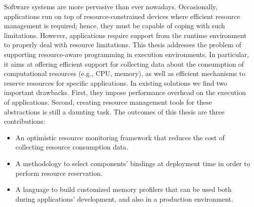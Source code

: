 Software systems are more pervasive than ever nowadays.
Occasionally, applications run on top of resource-constrained devices where efficient resource management is required; hence, they must be capable of coping with such limitations.
However, applications require support from the runtime environment to properly deal with resource limitations.
This thesis addresses the problem of supporting resource-aware programming in execution environments.
In particular, it aims at offering efficient support for collecting data about the consumption of computational resources (e.g., CPU, memory), as well as efficient mechanisms to reserve resources for specific applications.
In existing solutions we find two important drawbacks.
First, they impose performance overhead on the execution of applications.
Second, creating resource management tools for these abstractions is still a daunting task.
The outcomes of this thesis are three contributions:
\begin{itemize}
\item An optimistic resource monitoring framework that reduces
the cost of collecting resource consumption data.

\item A methodology to select components' bindings at deployment time in order to perform resource reservation.

\item A language to build customized memory profilers that can be used both during applications' development, and also in a production
environment. 
\end{itemize}
